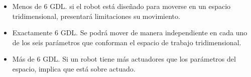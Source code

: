     \begin{itemize}
        \item Menos de 6 GDL.  si el robot está diseñado para moverse en un espacio tridimensional, presentará  limitaciones su movimiento. 
        \item Exactamente 6 GDL. Se podrá mover de manera independiente en cada uno de los seis parámetros que conforman el espacio de trabajo tridimensional.
        \item Más de 6 GDL. Si un robot tiene más actuadores que los parámetros del espacio, implica que está sobre actuado.
    \end{itemize}